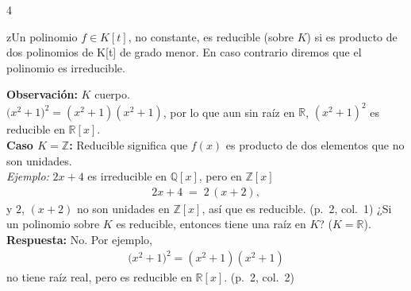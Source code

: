 \documentclass[landscape,a4paper]{article}
\begin{document}
\begin{multicols}{4}
\begin{tcolorbox}[colback=white,colframe=blue!80!black,colbacktitle=blue!80!black,coltitle=white,title={Definición: Irreducibilidad (p.~2, col.~1)}]
zUn polinomio $f \in K[t]$, no constante, es reducible (sobre $K$) si es producto de dos polinomios de K[t] de grado menor. En caso contrario diremos que el polinomio es irreducible.
\end{tcolorbox}
\noindent \textbf{Observación:} $K$ cuerpo.\\
$\bigl(x^2+1\bigr)^2 = (x^2+1)(x^2+1)$, por lo que aun sin raíz en $\mathbb{R}$, $(x^2+1)^2$ es reducible en $\mathbb{R}[x]$.\\
\vspace{0.5em}
\noindent \textbf{Caso $K=\mathbb{Z}$:} Reducible significa que $f(x)$ es producto de dos elementos que no son unidades.\\
\noindent \emph{Ejemplo:} $2x+4$ es irreducible en $\mathbb{Q}[x]$, pero en $\mathbb{Z}[x]$ 
\begin{align*}
2x + 4 \;=\; 2\, (x+2), 
\end{align*}
y $2$, $(x+2)$ no son unidades en $\mathbb{Z}[x]$, así que es reducible. (p.~2, col.~1)
\noindent ¿Si un polinomio sobre $K$ es reducible, entonces tiene una raíz en $K$? ($K=\mathbb{R}$).\\
\noindent \textbf{Respuesta:} No. Por ejemplo, 
\begin{align*}
\bigl(x^2+1\bigr)^2 = (x^2+1)(x^2+1)
\end{align*}
no tiene raíz real, pero es reducible en $\mathbb{R}[x]$. (p.~2, col.~2)


\end{multicols}
\end{document}

